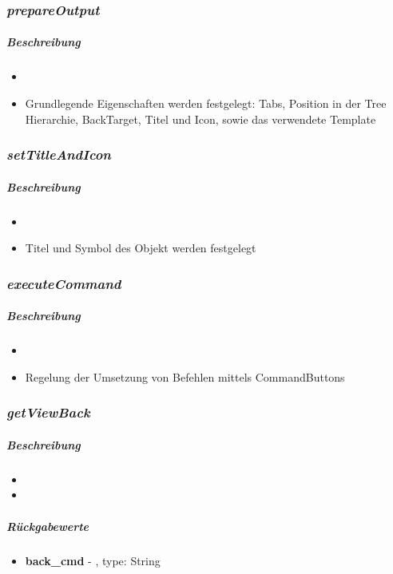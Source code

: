 \subsubsection*{\textit{prepareOutput}}\label{prepareOutputTGUI}
\subparagraph{Beschreibung}
\begin{itemize}
	\item[] \noindent{}
	\item[] Grundlegende Eigenschaften werden festgelegt: Tabs, Position in der Tree Hierarchie, BackTarget, Titel und Icon, sowie das verwendete Template
\end{itemize}

\subsubsection*{\textit{setTitleAndIcon}}\label{setTitleAndIconTGUI}
\subparagraph{Beschreibung}
\begin{itemize}
	\item[] \noindent{}
	\item[] Titel und Symbol des Objekt werden festgelegt
\end{itemize}

\subsubsection*{\textit{executeCommand}}\label{executeCommandTGUI}
\subparagraph{Beschreibung}
\begin{itemize}
	\item[] \noindent{}
	\item[] Regelung der Umsetzung von Befehlen mittels CommandButtons
\end{itemize}

\subsubsection*{\textit{getViewBack}}\label{getViewBackTGUI}
\subparagraph{Beschreibung}
\begin{itemize}
	\item[] \noindent{}
	\item[] 
\end{itemize}
\subparagraph{Rückgabewerte}
\begin{itemize}
	\item[] \textbf{back\_cmd} - , type: String
\end{itemize}

